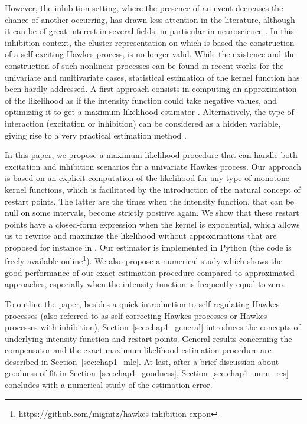 However, the inhibition setting, where the presence of an event decreases the chance of another occurring, has drawn less attention in the literature, although it can be of great interest in several fields, in particular in neuroscience \parencite{Reynaud2018}. In this inhibition context, the cluster representation \parencite{Hawkes1974} on which is based the construction of a self-exciting Hawkes process, is no longer valid.
While the existence and the construction of such nonlinear processes can be found in recent works for the univariate \parencite{Costa2020} and multivariate \parencite{Chen2017} cases,
statistical estimation of the kernel function has been hardly addressed.
A first approach consists in computing an approximation of the likelihood as if the intensity function could take negative values, and optimizing it to get a maximum likelihood estimator \parencite{Lemonnier2014}.
Alternatively, the type of interaction (excitation or inhibition) can be considered as a hidden variable, giving rise to a very practical estimation method \parencite{Mei2017}.

In this paper, we propose a maximum likelihood procedure that can handle both excitation and inhibition scenarios for a univariate Hawkes process. Our approach is based on an explicit computation of the likelihood for any type of monotone kernel functions, which is facilitated by the introduction of the natural concept of restart points. The latter are the times when the intensity function, that can be null on some intervals, become strictly positive again. We show that these restart points have a closed-form expression when the kernel is exponential, which allows us to rewrite and maximize the likelihood without approximations that are proposed for instance in \textcite{Lemonnier2014}.  Our estimator is implemented in Python (the code is freely available online\footnote{\url{https://github.com/migmtz/hawkes-inhibition-expon}}). We also propose a numerical study which shows the good performance of our exact estimation procedure compared to approximated approaches, especially when the intensity function is frequently equal to zero.

To outline the paper, besides a quick introduction to self-regulating Hawkes processes (also referred to as self-correcting Hawkes processes or Hawkes processes with inhibition), Section~\ref{sec:chap1_general} introduces the concepts of underlying intensity function and restart points.
General results concerning the compensator and the exact maximum likelihood estimation procedure are described in Section~\ref{sec:chap1_mle}.
At last, after a brief discussion about goodness-of-fit in Section~\ref{sec:chap1_goodness},
Section~\ref{sec:chap1_num_res} concludes with a numerical study of the estimation error.

